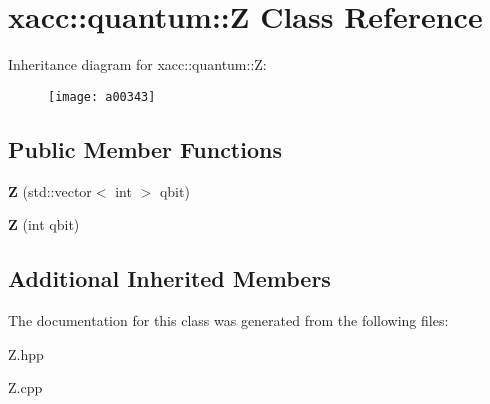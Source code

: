 \hypertarget{a00343}{}\section{xacc\+:\+:quantum\+:\+:Z Class Reference}
\label{a00343}
Inheritance diagram for xacc\+:\+:quantum\+:\+:Z\+:\begin{figure}[H]
\begin{center}
\leavevmode
\texttt{[image: a00343]}
\end{center}
\end{figure}
\subsection*{Public Member Functions}
\begin{DoxyCompactItemize}
\item 
{\bfseries Z} (std\+::vector$<$ int $>$ qbit)\hypertarget{a00343_a5f1d311b357faed8c2665fe20cf24aeb}{}\label{a00343_a5f1d311b357faed8c2665fe20cf24aeb}

\item 
{\bfseries Z} (int qbit)\hypertarget{a00343_aa1bb7e533e7595e9ecd06879a2f8d2de}{}\label{a00343_aa1bb7e533e7595e9ecd06879a2f8d2de}

\end{DoxyCompactItemize}
\subsection*{Additional Inherited Members}


The documentation for this class was generated from the following files\+:\begin{DoxyCompactItemize}
\item 
Z.\+hpp\item 
Z.\+cpp\end{DoxyCompactItemize}
